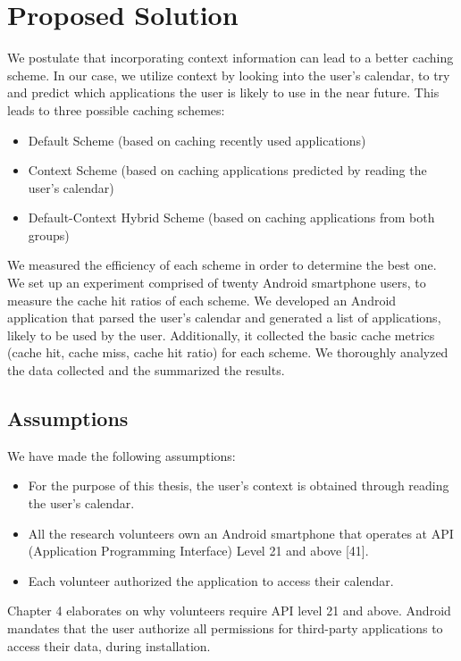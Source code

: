 \documentclass[12pt]{uthesis-v12}  %
\begin{document}
	\section{Proposed Solution}		
		We postulate that incorporating context information can lead to a better caching scheme. In our case, we utilize context by looking into the user's calendar, to try and predict which applications the user is likely to use in the near future. This leads to three possible caching schemes:
		
		\begin{itemize}
			\item Default Scheme (based on caching recently used applications)
			\item Context Scheme (based on caching applications predicted by reading the user's calendar)
			\item Default-Context Hybrid Scheme (based on caching applications from both groups)
		\end{itemize}
		
		We measured the efficiency of each scheme in order to determine the best one. We set up an experiment comprised of twenty Android smartphone users, to measure the cache hit ratios of each scheme. We developed an Android application that parsed the user's calendar and generated a list of applications, likely to be used by the user. Additionally, it collected the basic cache metrics (cache hit, cache miss, cache hit ratio) for each scheme. We thoroughly analyzed the data collected and the summarized the results.  
		
		\subsection{Assumptions}	
			We have made the following assumptions:
			\begin{itemize}
				\item For the purpose of this thesis, the user's context is obtained through reading the user's calendar.
				\item All the research volunteers own an Android smartphone that operates at API (Application Programming Interface) Level 21 and above [41].
				\item Each volunteer authorized the application to access their calendar.
			\end{itemize}
			
			Chapter 4 elaborates on why volunteers require API level 21 and above. Android mandates that the user authorize all permissions for third-party applications to access their data, during installation.
			
\end{document}
